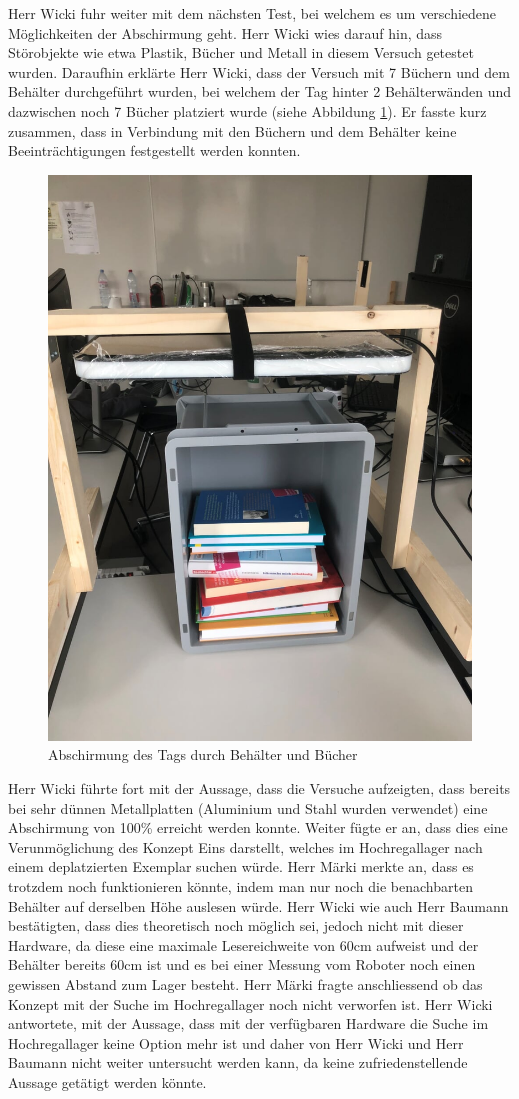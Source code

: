 \documentclass[parskip=full, a4paper]{scrreprt}
\begin{document}
Herr Wicki fuhr weiter mit dem nächsten Test, bei welchem es um verschiedene Möglichkeiten der Abschirmung geht. Herr Wicki wies darauf hin, dass Störobjekte wie etwa Plastik, Bücher und Metall in diesem Versuch getestet wurden. Daraufhin erklärte Herr Wicki, dass der Versuch mit 7 Büchern und dem Behälter durchgeführt wurden, bei welchem der Tag hinter 2 Behälterwänden und dazwischen noch 7 Bücher platziert wurde (siehe Abbildung \ref{fig:bucherMitBehälterAlsAbschirmung}). Er fasste kurz zusammen, dass in Verbindung mit den Büchern und dem Behälter keine Beeinträchtigungen festgestellt werden konnten.

\begin{figure}[htb]
	\centering
	\includegraphics[keepaspectratio,width=.6\linewidth]{img/AbschirmungDurchBehaelter}
	\caption{Abschirmung des Tags durch Behälter und Bücher}
	\label{fig:bucherMitBehälterAlsAbschirmung}
\end{figure}

Herr Wicki führte fort mit der Aussage, dass die Versuche aufzeigten, dass bereits bei sehr dünnen Metallplatten (Aluminium und Stahl wurden verwendet) eine Abschirmung von 100\% erreicht werden konnte. Weiter fügte er an, dass dies eine Verunmöglichung des Konzept Eins darstellt, welches im Hochregallager nach einem deplatzierten Exemplar suchen würde.
Herr Märki merkte an, dass es trotzdem noch funktionieren könnte, indem man nur noch die benachbarten Behälter auf derselben Höhe auslesen würde. Herr Wicki wie auch Herr Baumann bestätigten, dass dies theoretisch noch möglich sei, jedoch nicht mit dieser Hardware, da diese eine maximale Lesereichweite von 60cm aufweist und der Behälter bereits 60cm ist und es bei einer Messung vom Roboter noch einen gewissen Abstand zum Lager besteht. Herr Märki fragte anschliessend ob das Konzept mit der Suche im Hochregallager noch nicht verworfen ist. Herr Wicki antwortete, mit der Aussage, dass mit der verfügbaren Hardware die Suche im Hochregallager keine Option mehr ist und daher von Herr Wicki und Herr Baumann nicht weiter untersucht werden kann, da keine zufriedenstellende Aussage getätigt werden könnte.
\end{document}

